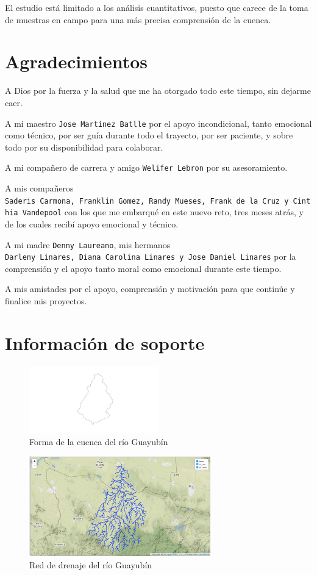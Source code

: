 \documentclass[11pt,]{article}
\begin{document}
El estudio está limitado a los análisis cuantitativos, puesto que carece
de la toma de muestras en campo para una más precisa comprensión de la
cuenca.

\section{Agradecimientos}\label{agradecimientos}

A Dios por la fuerza y la salud que me ha otorgado todo este tiempo, sin
dejarme caer.

A mi maestro \texttt{Jose\ Martínez\ Batlle} por el apoyo incondicional,
tanto emocional como técnico, por ser guía durante todo el trayecto, por
ser paciente, y sobre todo por su disponibilidad para colaborar.

A mi compañero de carrera y amigo \texttt{Welifer\ Lebron} por su
asesoramiento.

A mis compañeros
\texttt{Saderis\ Carmona,\ Franklin\ Gomez,\ Randy\ Mueses,\ Frank\ de\ la\ Cruz\ y\ Cinthia\ Vandepool}
con los que me embarqué en este nuevo reto, tres meses atrás, y de los
cuales recibí apoyo emocional y técnico.

A mi madre \texttt{Denny\ Laureano}, mis hermanos
\texttt{Darleny\ Linares,\ Diana\ Carolina\ Linares\ y\ Jose\ Daniel\ Linares}
por la comprensión y el apoyo tanto moral como emocional durante este
tiempo.

A mis amistades por el apoyo, comprensión y motivación para que continúe
y finalice mis proyectos.

\section{Información de soporte}\label{informaciuxf3n-de-soporte}

\begin{figure}
\centering
\includegraphics[width=0.50000\textwidth]{cuenca extraida.png}
\caption{Forma de la cuenca del río Guayubín\label{forma}}
\end{figure}

\begin{figure}
\centering
\includegraphics[width=0.70000\textwidth]{red de drenaje extraida.png}
\caption{Red de drenaje del río Guayubín\label{red de drenaje extraida}}
\end{figure}
\end{document}
